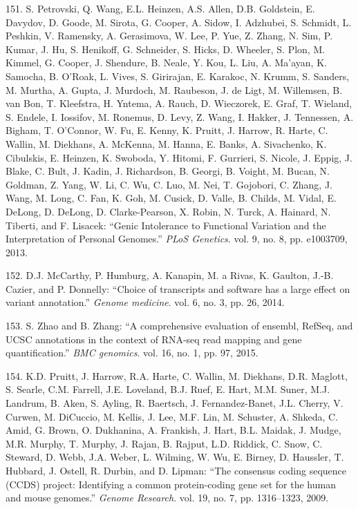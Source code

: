 \documentclass[12pt,twoside]{ugathesis}
\theoremstyle{definition}
\theoremstyle{definition}
\theoremstyle{remark}
\begin{document}
\hypertarget{ref-Petrovski2013}{}
151. S. Petrovski, Q. Wang, E.L. Heinzen, A.S. Allen, D.B. Goldstein, E.
Davydov, D. Goode, M. Sirota, G. Cooper, A. Sidow, I. Adzhubei, S.
Schmidt, L. Peshkin, V. Ramensky, A. Gerasimova, W. Lee, P. Yue, Z.
Zhang, N. Sim, P. Kumar, J. Hu, S. Henikoff, G. Schneider, S. Hicks, D.
Wheeler, S. Plon, M. Kimmel, G. Cooper, J. Shendure, B. Neale, Y. Kou,
L. Liu, A. Ma'ayan, K. Samocha, B. O'Roak, L. Vives, S. Girirajan, E.
Karakoc, N. Krumm, S. Sanders, M. Murtha, A. Gupta, J. Murdoch, M.
Raubeson, J. de Ligt, M. Willemsen, B. van Bon, T. Kleefstra, H. Yntema,
A. Rauch, D. Wieczorek, E. Graf, T. Wieland, S. Endele, I. Iossifov, M.
Ronemus, D. Levy, Z. Wang, I. Hakker, J. Tennessen, A. Bigham, T.
O'Connor, W. Fu, E. Kenny, K. Pruitt, J. Harrow, R. Harte, C. Wallin, M.
Diekhans, A. McKenna, M. Hanna, E. Banks, A. Sivachenko, K. Cibulskis,
E. Heinzen, K. Swoboda, Y. Hitomi, F. Gurrieri, S. Nicole, J. Eppig, J.
Blake, C. Bult, J. Kadin, J. Richardson, B. Georgi, B. Voight, M. Bucan,
N. Goldman, Z. Yang, W. Li, C. Wu, C. Luo, M. Nei, T. Gojobori, C.
Zhang, J. Wang, M. Long, C. Fan, K. Goh, M. Cusick, D. Valle, B. Childs,
M. Vidal, E. DeLong, D. DeLong, D. Clarke-Pearson, X. Robin, N. Turck,
A. Hainard, N. Tiberti, and F. Lisacek: ``Genic Intolerance to
Functional Variation and the Interpretation of Personal Genomes.''
\emph{PLoS Genetics}. vol. 9, no. 8, pp. e1003709, 2013.

\hypertarget{ref-McCarthy2014}{}
152. D.J. McCarthy, P. Humburg, A. Kanapin, M. a Rivas, K. Gaulton,
J.-B. Cazier, and P. Donnelly: ``Choice of transcripts and software has
a large effect on variant annotation.'' \emph{Genome medicine}. vol. 6,
no. 3, pp. 26, 2014.

\hypertarget{ref-Zhao2015}{}
153. S. Zhao and B. Zhang: ``A comprehensive evaluation of ensembl,
RefSeq, and UCSC annotations in the context of RNA-seq read mapping and
gene quantification.'' \emph{BMC genomics}. vol. 16, no. 1, pp. 97,
2015.

\hypertarget{ref-Pruitt2009}{}
154. K.D. Pruitt, J. Harrow, R.A. Harte, C. Wallin, M. Diekhans, D.R.
Maglott, S. Searle, C.M. Farrell, J.E. Loveland, B.J. Ruef, E. Hart,
M.M. Suner, M.J. Landrum, B. Aken, S. Ayling, R. Baertsch, J.
Fernandez-Banet, J.L. Cherry, V. Curwen, M. DiCuccio, M. Kellis, J. Lee,
M.F. Lin, M. Schuster, A. Shkeda, C. Amid, G. Brown, O. Dukhanina, A.
Frankish, J. Hart, B.L. Maidak, J. Mudge, M.R. Murphy, T. Murphy, J.
Rajan, B. Rajput, L.D. Riddick, C. Snow, C. Steward, D. Webb, J.A.
Weber, L. Wilming, W. Wu, E. Birney, D. Haussler, T. Hubbard, J. Ostell,
R. Durbin, and D. Lipman: ``The consensus coding sequence (CCDS)
project: Identifying a common protein-coding gene set for the human and
mouse genomes.'' \emph{Genome Research}. vol. 19, no. 7, pp. 1316--1323,
2009.
\end{document}

